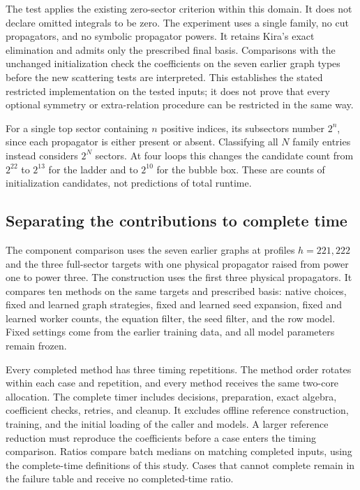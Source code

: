 The test applies the existing zero-sector criterion within this domain. It does not declare omitted integrals to be zero. The experiment uses a single family, no cut propagators, and no symbolic propagator powers. It retains Kira's exact elimination and admits only the prescribed final basis. Comparisons with the unchanged initialization check the coefficients on the seven earlier graph types before the new scattering tests are interpreted. This establishes the stated restricted implementation on the tested inputs; it does not prove that every optional symmetry or extra-relation procedure can be restricted in the same way.

For a single top sector containing $n$ positive indices, its subsectors number $2^n$, since each propagator is either present or absent. Classifying all $N$ family entries instead considers $2^N$ sectors. At four loops this changes the candidate count from $2^{22}$ to $2^{13}$ for the ladder and to $2^{10}$ for the bubble box. These are counts of initialization candidates, not predictions of total runtime.

\subsection{Separating the contributions to complete time}
The component comparison uses the seven earlier graphs at profiles $h=221,222$ and the three full-sector targets with one physical propagator raised from power one to power three. The construction uses the first three physical propagators. It compares ten methods on the same targets and prescribed basis: native choices, fixed and learned graph strategies, fixed and learned seed expansion, fixed and learned worker counts, the equation filter, the seed filter, and the row model. Fixed settings come from the earlier training data, and all model parameters remain frozen.

Every completed method has three timing repetitions. The method order rotates within each case and repetition, and every method receives the same two-core allocation. The complete timer includes decisions, preparation, exact algebra, coefficient checks, retries, and cleanup. It excludes offline reference construction, training, and the initial loading of the caller and models. A larger reference reduction must reproduce the coefficients before a case enters the timing comparison. Ratios compare batch medians on matching completed inputs, using the complete-time definitions of this study. Cases that cannot complete remain in the failure table and receive no completed-time ratio.

